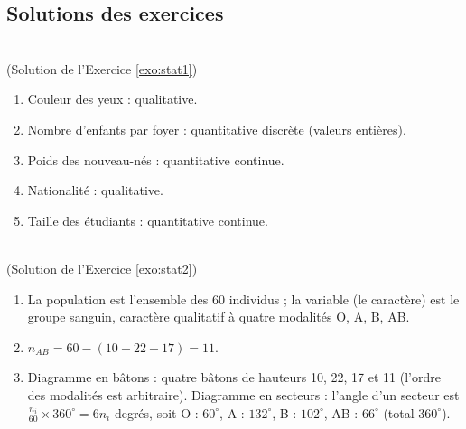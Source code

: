 \begin{corrige}
\section{Solutions des exercices}
\begin{sol} ~ \\
(Solution de l'Exercice \ref{exo:stat1})
\begin{enumerate}
\item Couleur des yeux : qualitative.
\item Nombre d'enfants par foyer : quantitative discr\`ete (valeurs enti\`eres).
\item Poids des nouveau-n\'es : quantitative continue.
\item Nationalit\'e : qualitative.
\item Taille des \'etudiants : quantitative continue.
\end{enumerate}
\end{sol}

\begin{sol} ~ \\
(Solution de l'Exercice \ref{exo:stat2})
\begin{enumerate}
\item La population est l'ensemble des 60 individus ; la variable (le caract\`ere) est le groupe sanguin,
      caract\`ere qualitatif \`a quatre modalit\'es O, A, B, AB.
\item $n_{AB} = 60 - (10 + 22 + 17) = 11$.
\item Diagramme en b\^atons : quatre b\^atons de hauteurs 10, 22, 17 et 11 (l'ordre des modalit\'es est arbitraire).
      Diagramme en secteurs : l'angle d'un secteur est $\frac{n_i}{60} \times 360^\circ = 6 n_i$ degr\'es, 
      soit O : $60^\circ$, A : $132^\circ$, B : $102^\circ$, AB : $66^\circ$ (total $360^\circ$).
\end{enumerate}
\end{sol}


\end{corrige}
